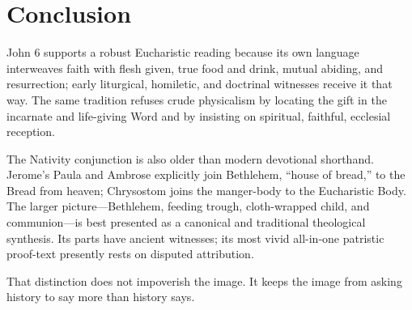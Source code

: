 \section{Conclusion}

John 6 supports a robust Eucharistic reading because its own language
interweaves faith with flesh given, true food and drink, mutual abiding, and
resurrection; early liturgical, homiletic, and doctrinal witnesses receive it
that way. The same tradition refuses crude physicalism by locating the gift in
the incarnate and life-giving Word and by insisting on spiritual, faithful,
ecclesial reception.

The Nativity conjunction is also older than modern devotional shorthand.
Jerome's Paula and Ambrose explicitly join Bethlehem, ``house of bread,'' to
the Bread from heaven; Chrysostom joins the manger-body to the Eucharistic
Body. The larger picture---Bethlehem, feeding trough, cloth-wrapped child, and
communion---is best presented as a canonical and traditional
theological synthesis. Its parts have ancient witnesses; its most vivid
all-in-one patristic proof-text presently rests on disputed attribution.

That distinction does not impoverish the image. It keeps the image from asking
history to say more than history says.

